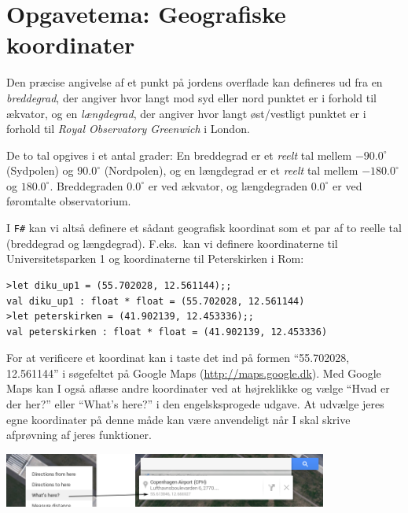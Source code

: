 \documentclass[a4paper,12pt]{article}
\newcommand{\fs}{\texttt{F\#} }
\begin{document}
\newpage
\section{Opgavetema: Geografiske koordinater}
Den præcise angivelse af et punkt på jordens overflade kan defineres
ud fra en \textit{breddegrad}, der angiver hvor langt mod syd eller
nord punktet er i forhold til ækvator, og en \textit{længdegrad}, der
angiver hvor langt øst/vestligt punktet er i forhold til \textit{Royal
  Observatory Greenwich} i London.

De to tal opgives i et antal grader: En breddegrad er et
\textit{reelt} tal mellem $-90.0^\circ$ (Sydpolen) og $90.0^\circ$
(Nordpolen), og en længdegrad er et \textit{reelt} tal mellem
$-180.0^\circ$ og $180.0^\circ$. Breddegraden $0.0^\circ$ er ved
ækvator, og længdegraden $0.0^\circ$ er ved føromtalte observatorium.

I \fs kan vi altså definere et sådant geografisk koordinat som et par
af to reelle tal (breddegrad og længdegrad).  F.eks.\ kan vi definere
koordinaterne til Universitetsparken 1 og koordinaterne til
Peterskirken i Rom:
\begin{verbatim}
>let diku_up1 = (55.702028, 12.561144);;
val diku_up1 : float * float = (55.702028, 12.561144)
>let peterskirken = (41.902139, 12.453336);;
val peterskirken : float * float = (41.902139, 12.453336)

\end{verbatim}
For at verificere et koordinat kan i taste det ind på formen
"`55.702028, 12.561144"' i søgefeltet på Google Maps
(\url{http://maps.google.dk}). Med Google Maps kan I også aflæse andre
koordinater ved at højreklikke og vælge "`Hvad er der her?"' eller
"`What's here?"' i den engelsksprogede udgave. At udvælge jeres egne
koordinater på denne måde kan være anvendeligt når I skal skrive
afprøvning af jeres funktioner.

\begin{center}
\includegraphics[width=0.8\textwidth]{uge2_googlemaps.png}
\end{center}
\end{document}
